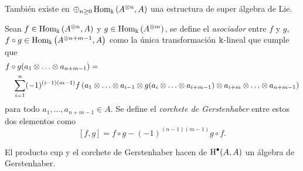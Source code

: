 \documentclass[a4paper,oneside,fleqn,11pt,../tesis.tex]{subfiles}
\begin{document}
También existe en $\oplus_{n \geq 0}\operatorname{Hom}_{\Bbbk}\left(A^{\otimes n}, A\right)$ una estructura de super álgebra de Lie.
\begin{definition}
Sean $f \in \operatorname{Hom}_{\Bbbk}\left(A^{\otimes n}, A\right)$ y $g \in \operatorname{Hom}_{\Bbbk}\left(A^{\otimes m}\right)$, se define el \emph{asociador}
entre $f$ y $g$, $f \circ g \in \operatorname{Hom}_{\Bbbk}\left(A^{\otimes n + m - 1}, A\right)$ como la única transformación $\Bbbk$-lineal que cumple que
	\begin{align*}
		&f \circ g (a_1\otimes \ldots \otimes a_{n + m - 1 }) = \\
		&\quad\sum_{i = 1}^n (-1)^{(i - 1)(m -1)}
				f\left(a_1\otimes \ldots \otimes a_{i - 1} \otimes g(a_{i} \otimes \ldots \otimes a_{i + m - 1}) \otimes a_{i + m} \otimes \ldots \otimes a_{n + m - 1}\right)
	\end{align*}
	para todo $a_1, \ldots, a_{n + m - 1} \in A$.
Se define el \emph{corchete de Gerstenhaber} entre estos dos elementos como
\[
	\left[f, g\right] = f \circ g  - (-1)^{(n -1)(m -1)}g \circ f.
\] 
\end{definition}

El producto cup y el corchete de Gerstenhaber hacen de $\operatorname{H}^{\bullet}(A, A)$ un álgebra de Gerstenhaber.
\end{document}
